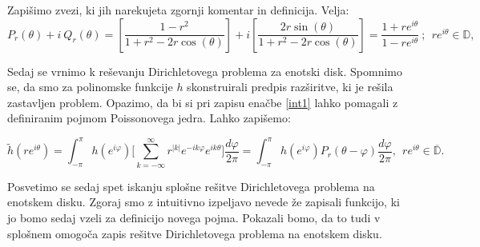 \documentclass[mat1]{fmfdelo}
\begin{document}
    \begin{opomba}
        Zapišimo zvezi, ki jih narekujeta zgornji komentar in definicija. Velja:
        $$
        P_r(\theta) + i~Q_r(\theta) = \left[ \frac{1-r^2}{1+ r^2 - 2r \cos(\theta)}\right] + i \left[\frac{2 r \sin(\theta)}{1+ r^2 - 2r \cos(\theta)}\right] = \frac{1 + re^{i\theta}}{1 - re^{i\theta}}~;~~r e^{i\theta} \in \mathbb{D}, 
        $$
    \end{opomba}

    Sedaj se vrnimo k reševanju Dirichletovega problema za enotski disk. 
    Spomnimo se, da smo za polinomske funkcije $h$ skonstruirali predpis razširitve, ki je rešila zastavljen problem. 
    Opazimo, da bi si pri zapisu enačbe \eqref{int1} lahko pomagali z definiranim pojmom Poissonovega jedra. Lahko zapišemo:
    
    $$
    \widetilde{h}(r e^{i \theta}) = \int_{-\pi}^{\pi}{h(e^{i \varphi}) \bigg[\sum_{k = - \infty}^{\infty} r^{|k|} e^{- i k \varphi} e^{i k \theta}} \bigg]\frac{d \varphi}{2 \pi} = 
    \int_{-\pi}^{\pi}{h(e^{i \varphi}) P_r(\theta - \varphi)\frac{d \varphi}{2 \pi}},~~r e^{i \theta} \in \overline{\mathbb{D}}.
    $$
    
    Posvetimo se sedaj spet iskanju splošne rešitve Dirichletovega problema na enotskem disku. Zgoraj smo z intuitivno izpeljavo nevede že zapisali funkcijo, ki jo bomo sedaj vzeli za definicijo novega pojma. 
    Pokazali bomo, da to tudi v splošnem omogoča zapis rešitve Dirichletovega problema na enotskem disku.
\end{document}
